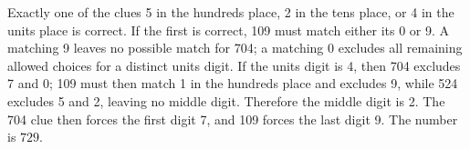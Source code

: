 Exactly one of the clues 5 in the hundreds place, 2 in the tens place, or 4 in the units place is correct. If the first is correct, 109 must match either its 0 or 9. A matching 9 leaves no possible match for 704; a matching 0 excludes all remaining allowed choices for a distinct units digit. If the units digit is 4, then 704 excludes 7 and 0; 109 must then match 1 in the hundreds place and excludes 9, while 524 excludes 5 and 2, leaving no middle digit. Therefore the middle digit is 2. The 704 clue then forces the first digit 7, and 109 forces the last digit 9. The number is $\boxed{729}$.
